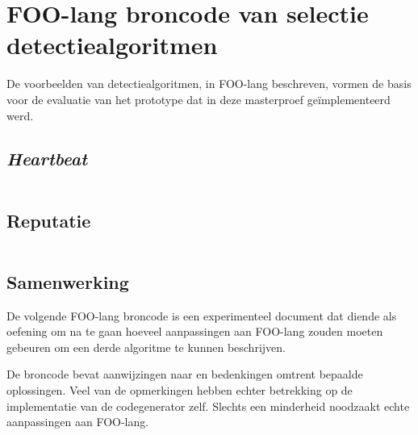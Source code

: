 
\chapter{FOO-lang broncode van selectie detectiealgoritmen}
\label{appendix:demo-code}

De voorbeelden van detectiealgoritmen, in FOO-lang beschreven, vormen de basis
voor de evaluatie van het prototype dat in deze masterproef ge\"implementeerd
werd.

\section{\emph{Heartbeat}}
\label{section:demo-code-heartbeat}

\inputminted[linenos,frame=lines,framesep=2mm,fontsize=\footnotesize]{js}{../src/foo-lang/examples/heartbeat.foo}
\vspace{-5mm}

\section{Reputatie}
\label{section:demo-code-reputation}

\inputminted[linenos,frame=lines,framesep=2mm,fontsize=\footnotesize]{js}{../src/foo-lang/examples/reputation.foo}
\vspace{-5mm}

\section{Samenwerking}
\label{section:demo-code-cooperation}

De volgende FOO-lang broncode is een experimenteel document dat diende als
oefening om na te gaan hoeveel aanpassingen aan FOO-lang zouden moeten gebeuren
om een derde algoritme te kunnen beschrijven.

De broncode bevat aanwijzingen naar en bedenkingen omtrent bepaalde
oplossingen. Veel van de opmerkingen hebben echter betrekking op de
implementatie van de codegenerator zelf. Slechts een minderheid noodzaakt echte
aanpassingen aan FOO-lang.

\inputminted[linenos,frame=lines,framesep=2mm,fontsize=\footnotesize]{js}{../src/foo-lang/examples/cooperation.foo}
\vspace{-5mm}
